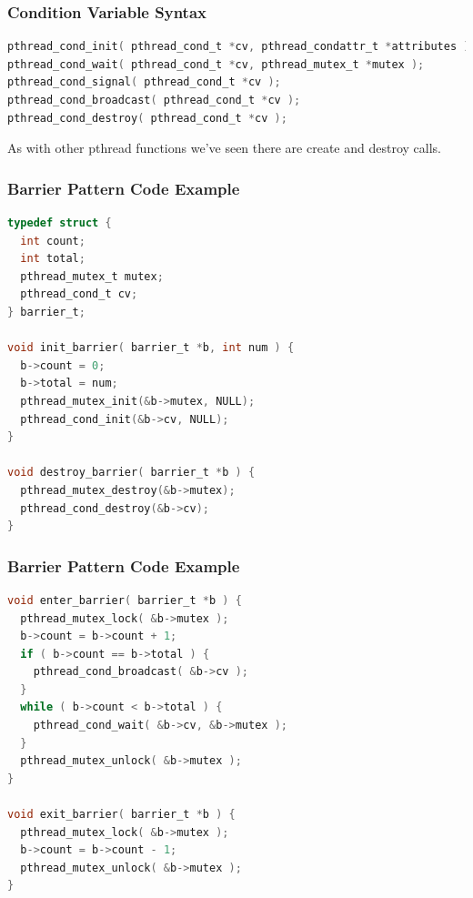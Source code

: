 \begin{frame}[fragile]
	\frametitle{Condition Variable Syntax}

	\begin{lstlisting}[language=C]
pthread_cond_init( pthread_cond_t *cv, pthread_condattr_t *attributes );
pthread_cond_wait( pthread_cond_t *cv, pthread_mutex_t *mutex );
pthread_cond_signal( pthread_cond_t *cv );
pthread_cond_broadcast( pthread_cond_t *cv );
pthread_cond_destroy( pthread_cond_t *cv );
\end{lstlisting}

	As with other pthread functions we've seen there are create and destroy calls.

\end{frame}

\begin{frame}[fragile]
	\frametitle{Barrier Pattern Code Example}
	\begin{lstlisting}[language=C]
typedef struct {
  int count;
  int total;
  pthread_mutex_t mutex;
  pthread_cond_t cv;
} barrier_t;

void init_barrier( barrier_t *b, int num ) {
  b->count = 0;
  b->total = num;
  pthread_mutex_init(&b->mutex, NULL);
  pthread_cond_init(&b->cv, NULL);
}

void destroy_barrier( barrier_t *b ) {
  pthread_mutex_destroy(&b->mutex);
  pthread_cond_destroy(&b->cv);
}
	\end{lstlisting}

\end{frame}

\begin{frame}[fragile]
	\frametitle{Barrier Pattern Code Example}
	\begin{lstlisting}[language=C]
void enter_barrier( barrier_t *b ) {
  pthread_mutex_lock( &b->mutex );
  b->count = b->count + 1;
  if ( b->count == b->total ) {
    pthread_cond_broadcast( &b->cv );
  }
  while ( b->count < b->total ) {
    pthread_cond_wait( &b->cv, &b->mutex );
  }
  pthread_mutex_unlock( &b->mutex );
}

void exit_barrier( barrier_t *b ) {
  pthread_mutex_lock( &b->mutex );
  b->count = b->count - 1;
  pthread_mutex_unlock( &b->mutex );
}
	\end{lstlisting}

\end{frame}


